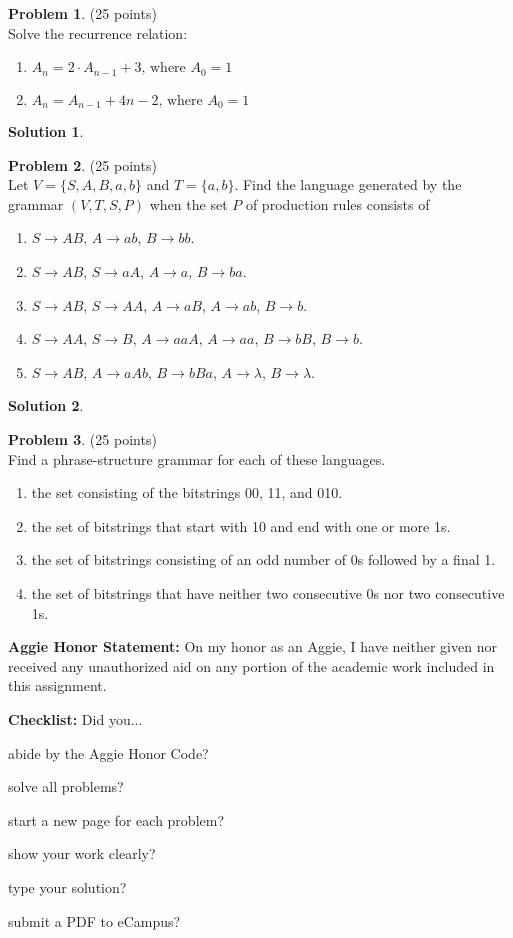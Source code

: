 \documentclass{article}
\theoremstyle{definition}
\newtheorem{problem}{Problem}
\newtheorem*{solution}{Solution}
\newcommand{\honor}{\noindent \textbf{Aggie Honor Statement: }On my honor as an Aggie, I have neither
  given nor received any unauthorized aid on any portion of the academic work included in this assignment.
}
\newcommand{\checklist}{\noindent\textbf{Checklist:}
Did you...
\begin{compactenum}
\item abide by the Aggie Honor Code?
\item solve all problems?
\item start a new page for each problem?
\item show your work clearly?
\item type your solution?
\item submit a PDF to eCampus?
\end{compactenum}
}
\begin{document}
\newpage

\begin{problem} (25 points)\\
Solve the recurrence relation:
\begin{enumerate}
\item $A_n = 2\cdot A_{n-1} + 3 \text{, where } A_0 = 1$
\item $A_n = A_{n-1} + 4n - 2\text{, where } A_0 = 1$
\end{enumerate}
\end{problem}

\begin{solution}\ \\

\end{solution}

\newpage

\begin{problem} (25 points)\\
Let $V=\{S,A,B,a,b\}$ and $T=\{a,b\}$.  Find the language generated by the grammar $(V,T,S,P)$ when the set $P$ of production rules consists of
\begin{enumerate}
\item $S\to AB$, $A \to ab$, $B\to bb$.
\item $S \to AB$, $S \to aA$, $A \to a$, $B \to ba$.
\item $S \to AB$, $S \to AA$, $A\to aB$, $A\to ab$, $B\to b$.
\item $S \to AA$, $S \to B$, $A \to aaA$, $A \to aa$, $B \to bB$, $B \to b$.
\item $S \to AB$, $A \to aAb$, $B \to bBa$, $A \to \lambda$, $B \to \lambda$.
\end{enumerate}
\end{problem}

\begin{solution}\ \\

\end{solution}

\newpage

\begin{problem} (25 points)\\
Find a phrase-structure grammar for each of these languages.
\begin{enumerate}
\item the set consisting of the bitstrings 00, 11, and 010.
\item the set of bitstrings that start with 10 and end with one or more 1s.
\item the set of bitstrings consisting of an odd number of 0s followed by a final 1.
\item the set of bitstrings that have neither two consecutive 0s nor two consecutive 1s.
\end{enumerate}
\end{problem}



\bigskip
\honor

\bigskip
\checklist
\end{document}
